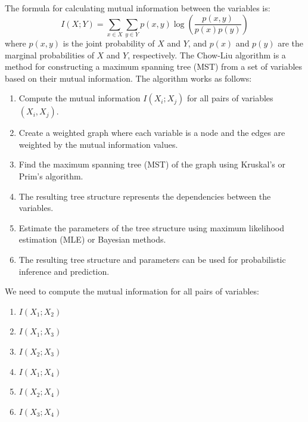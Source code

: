 \documentclass[a3paper,12pt]{extarticle} %
\begin{document}
The formula for calculating mutual information between the variables is:
\[
I(X;Y) = \sum_{x \in X} \sum_{y \in Y} p(x,y) \log\left(\frac{p(x,y)}{p(x)p(y)}\right)
\]
where \( p(x,y) \) is the joint probability of \( X \) and \( Y \), and \( p(x) \) and \( p(y) \) are the marginal probabilities of \( X \) and \( Y \), respectively.
The Chow-Liu algorithm is a method for constructing a maximum spanning tree (MST) from a set of variables based on their mutual information. The algorithm works as follows:
\begin{enumerate}
    \item Compute the mutual information \( I(X_i; X_j) \) for all pairs of variables \( (X_i, X_j) \).
    \item Create a weighted graph where each variable is a node and the edges are weighted by the mutual information values.
    \item Find the maximum spanning tree (MST) of the graph using Kruskal's or Prim's algorithm.
    \item The resulting tree structure represents the dependencies between the variables.
    \item Estimate the parameters of the tree structure using maximum likelihood estimation (MLE) or Bayesian methods.
    \item The resulting tree structure and parameters can be used for probabilistic inference and prediction.
\end{enumerate}
We need to compute the mutual information for all pairs of variables:
\begin{enumerate}
    \item \( I(X_1; X_2)\)
    \item \( I(X_1; X_3) \)
    \item \( I(X_2; X_3) \)
    \item \( I(X_1; X_4) \)
    \item \( I(X_2; X_4) \)
    \item \( I(X_3; X_4) \)
\end{enumerate}
\end{document}
